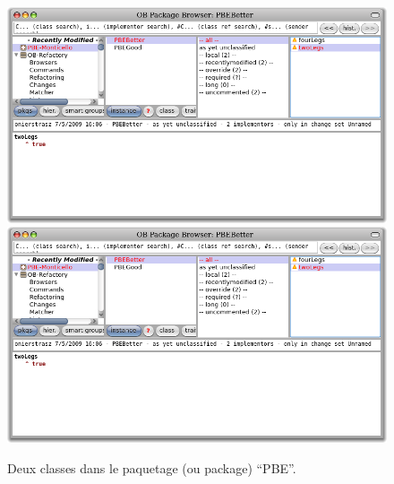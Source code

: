 \documentclass[a4paper,10pt,twoside]{book}
\begin{document}
\begin{figure}[btp]
	\begin{center}
	\ifluluelse
		{\includegraphics[width=\textwidth]{MCnewcategory}}
		{\includegraphics[scale=0.7]{MCnewcategory}}
	\end{center}
	\caption{Deux classes dans le paquetage (ou package) ``PBE''.}
	\label{fig:MCnewcategory}
\end{figure}
\end{document}
